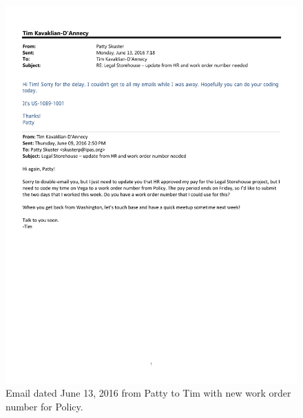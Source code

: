 \begin{figure}
   \centering
       \noindent\includegraphics[page=1,angle=-90,origin=c,width=.75\textwidth,height=.75\textheight]{documents/2016-06-13-Email-Patty.pdf}
 \caption{Email dated June 13, 2016 from Patty to Tim with new work order number for Policy.}
 \label{fig:2016-06-13-Email-Patty}
\end{figure}

